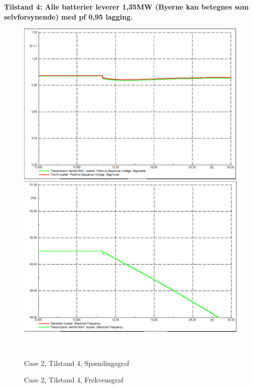 \textbf{Tilstand 4: Alle batterier leverer 1,35MW (Byerne kan betegnes som selvforsynende) med pf 0,95 lagging.}
\begin{figure}[H]
	\centering
	\begin{minipage}[b]{0.48\textwidth}
		\centering
		\includegraphics[width=1.00\textwidth]{figurer/LargeDisturbance/Voltage4} %
	\end{minipage}
	\hfill
	\begin{minipage}[b]{0.48\textwidth}
		\centering
		\includegraphics[width=1.00\textwidth]{figurer/LargeDisturbance/Freq4} %
	\end{minipage}
	\\ %
	\begin{minipage}[t]{0.48\textwidth}
		\caption{Case 2, Tilstand 4, Spændingsgraf} %
		\label{fig:C2T4V}
	\end{minipage}
	\hfill
	\begin{minipage}[t]{0.48\textwidth}
		\caption{Case 2, Tilstand 4, Frekvensgraf} %
		\label{fig:C2T4F}
	\end{minipage}
\end{figure}


